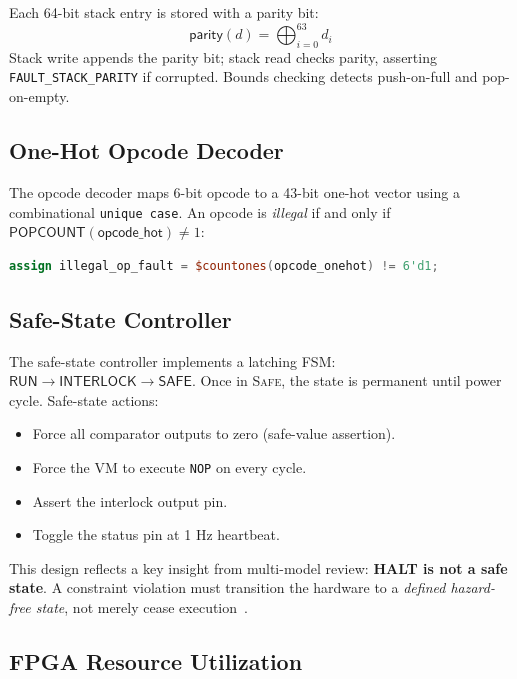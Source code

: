 \documentclass[sigplan,10pt,review]{acmart}
\begin{document}
Each 64-bit stack entry is stored with a parity bit:
\[
  \mathsf{parity}(d) = \bigoplus_{i=0}^{63} d_i
\]
Stack write appends the parity bit; stack read checks parity, asserting
\texttt{FAULT\_STACK\_PARITY} if corrupted. Bounds checking detects push-on-full
and pop-on-empty.

\subsection{One-Hot Opcode Decoder}

The opcode decoder maps 6-bit opcode to a 43-bit one-hot vector using a
combinational \texttt{unique case}. An opcode is \emph{illegal} if and only if
$\mathsf{POPCOUNT}(\mathsf{opcode\_hot}) \neq 1$:
\begin{lstlisting}[language=Verilog,style=rustcode,caption={One-hot decode with illegal-op detection.},label={lst:onehot}]
assign illegal_op_fault = $countones(opcode_onehot) != 6'd1;
\end{lstlisting}

\subsection{Safe-State Controller}

The safe-state controller implements a latching FSM:
$\mathsf{RUN} \to \mathsf{INTERLOCK} \to \mathsf{SAFE}$. Once in
\textsc{Safe}, the state is permanent until power cycle. Safe-state actions:
\begin{itemize}
  \item Force all comparator outputs to zero (safe-value assertion).
  \item Force the VM to execute \texttt{NOP} on every cycle.
  \item Assert the interlock output pin.
  \item Toggle the status pin at 1 Hz heartbeat.
\end{itemize}

This design reflects a key insight from multi-model review: \textbf{HALT is not a
safe state}. A constraint violation must transition the hardware to a \emph{defined
hazard-free state}, not merely cease execution~\cite{deep-research-2026}.

\subsection{FPGA Resource Utilization}
\end{document}

